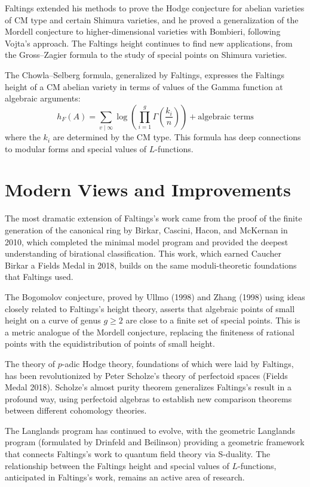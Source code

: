 Faltings extended his methods to prove the Hodge conjecture for abelian varieties of CM type and certain Shimura varieties, and he proved a generalization of the Mordell conjecture to higher-dimensional varieties with Bombieri, following Vojta's approach. The Faltings height continues to find new applications, from the Gross--Zagier formula to the study of special points on Shimura varieties.

The Chowla--Selberg formula, generalized by Faltings, expresses the Faltings height of a CM abelian variety in terms of values of the Gamma function at algebraic arguments:
\[
h_F(A) = \sum_{v \mid \infty} \log \left( \prod_{i=1}^{g} \Gamma\left(\frac{k_i}{n}\right) \right) + \text{algebraic terms}
\]
where the $k_i$ are determined by the CM type. This formula has deep connections to modular forms and special values of $L$-functions.

\section{Modern Views and Improvements}

The most dramatic extension of Faltings's work \cite{faltings1983} came from the proof of the finite generation of the canonical ring by Birkar, Cascini, Hacon, and McKernan in 2010, which completed the minimal model program and provided the deepest understanding of birational classification. This work, which earned Caucher Birkar a Fields Medal in 2018, builds on the same moduli-theoretic foundations that Faltings used.

The Bogomolov conjecture, proved by Ullmo (1998) and Zhang (1998) using ideas closely related to Faltings's height theory, asserts that algebraic points of small height on a curve of genus $g \geq 2$ are close to a finite set of special points. This is a metric analogue of the Mordell conjecture, replacing the finiteness of rational points with the equidistribution of points of small height.

The theory of $p$-adic Hodge theory, foundations of which were laid by Faltings, has been revolutionized by Peter Scholze's theory of perfectoid spaces (Fields Medal 2018). Scholze's almost purity theorem generalizes Faltings's result in a profound way, using perfectoid algebras to establish new comparison theorems between different cohomology theories.

The Langlands program has continued to evolve, with the geometric Langlands program (formulated by Drinfeld and Beilinson) providing a geometric framework that connects Faltings's work \cite{faltings1983} to quantum field theory via S-duality. The relationship between the Faltings height and special values of $L$-functions, anticipated in Faltings's work, remains an active area of research.

